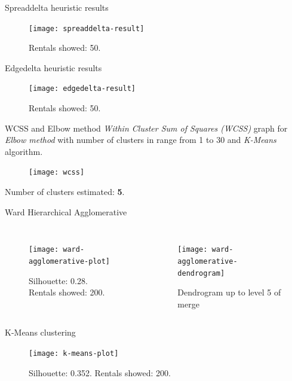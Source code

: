 \documentclass{beamer}
\begin{document}
\begin{frame}{Spreaddelta heuristic results}
	\begin{figure}[bt]
		\centering
		\texttt{[image: spreaddelta-result]}
		\label{fig:spreaddelta-result}
		\caption{Rentals showed: 50.}
	\end{figure}
\end{frame}

\begin{frame}{Edgedelta heuristic results}
\begin{figure}[bt]
	\centering
	\texttt{[image: edgedelta-result]}
	\label{fig:edgedelta-result}
	\caption{Rentals showed: 50.}
\end{figure}
\end{frame}

\begin{frame}{WCSS and Elbow method}
\textit{Within Cluster Sum of Squares (WCSS)} graph for \textit{Elbow method} with number of clusters in range from 1 to 30 and \textit{K-Means} algorithm.
\begin{figure}[bt]
	\centering
	\texttt{[image: wcss]}
	\label{fig:wcss}
\end{figure}
Number of clusters estimated: \textbf{5}.
\end{frame}

\begin{frame}{Ward Hierarchical Agglomerative}
\begin{columns}[t, onlytextwidth]
	\begin{figure}[bt]
		\centering
		\texttt{[image: ward-agglomerative-plot]}
		\caption{Silhouette: 0.28. Rentals showed: 200.}
		\label{fig:ward-agglomerative-line}
	\end{figure}
	\begin{figure}[bt]
		\centering
		\texttt{[image: ward-agglomerative-dendrogram]}
		\caption{Dendrogram up to level 5 of merge}
		\label{fig:ward-agglomerative-dendrogram}
	\end{figure}
\end{columns}
\end{frame}

\begin{frame}{K-Means clustering}
\begin{figure}[bt]
	\centering
	\texttt{[image: k-means-plot]}
	\caption{Silhouette: 0.352. Rentals showed: 200.}
	\label{fig:k-means-line}
\end{figure}
\end{frame}
\end{document}
